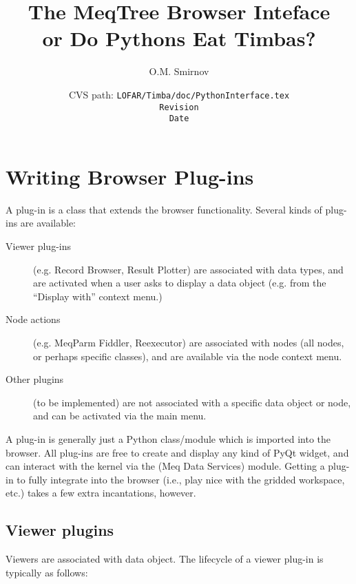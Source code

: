 \documentclass[12pt,twoside]{book}
\title{{\sf The MeqTree Browser Inteface\\\small or Do Pythons Eat Timbas?}}
\author{{\sf O.M. Smirnov}}
\date{\vspace{2cm}\small CVS path: \tt LOFAR/Timba/doc/PythonInterface.tex\\\rm
$ $Revision$ $\\$ $Date$ $}
\begin{document}
\sloppy

\maketitle


\chapter{Writing Browser Plug-ins}

  A plug-in is a class that extends the browser functionality. Several kinds of
  plug-ins are available:
  
  \begin{description}
  
  \item[Viewer plug-ins] (e.g. Record Browser, Result Plotter) are associated
  with data types, and are activated when a user asks to display a data object
  (e.g. from the ``Display with'' context menu.)

  \item[Node actions] (e.g. MeqParm Fiddler, Reexecutor) are associated with
  nodes (all nodes, or perhaps specific classes), and are available via the node
  context menu.

  \item[Other plugins] (to be implemented) are not associated with a specific
  data object or node, and can be activated via the main menu.

  \end{description}
  
  A plug-in is generally just a Python class/module which is imported into the
  browser. All plug-ins are free to create and display any kind of PyQt widget,
  and can interact with the kernel via the  (Meq Data Services)
  module. Getting a plug-in to fully integrate into the browser (i.e., 
  play nice with the gridded workspace, etc.) takes a few extra incantations,
  however.
  
\section{Viewer plugins}

  Viewers are associated with data object. The lifecycle of a viewer plug-in is
  typically as follows:
  
\end{document}
